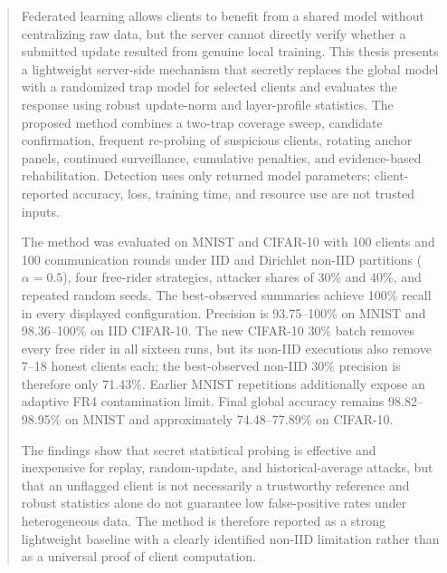 \documentclass{iutmscthesis}
\begin{document}
\begin{abstract}
Federated learning allows clients to benefit from a shared model without centralizing raw data, but the server cannot directly verify whether a submitted update resulted from genuine local training. This thesis presents a lightweight server-side mechanism that secretly replaces the global model with a randomized trap model for selected clients and evaluates the response using robust update-norm and layer-profile statistics. The proposed method combines a two-trap coverage sweep, candidate confirmation, frequent re-probing of suspicious clients, rotating anchor panels, continued surveillance, cumulative penalties, and evidence-based rehabilitation. Detection uses only returned model parameters; client-reported accuracy, loss, training time, and resource use are not trusted inputs.

The method was evaluated on MNIST and CIFAR-10 with 100 clients and 100 communication rounds under IID and Dirichlet non-IID partitions ($\alpha=0.5$), four free-rider strategies, attacker shares of 30\% and 40\%, and repeated random seeds. The best-observed summaries achieve 100\% recall in every displayed configuration. Precision is 93.75--100\% on MNIST and 98.36--100\% on IID CIFAR-10. The new CIFAR-10 30\% batch removes every free rider in all sixteen runs, but its non-IID executions also remove 7--18 honest clients each; the best-observed non-IID 30\% precision is therefore only 71.43\%. Earlier MNIST repetitions additionally expose an adaptive FR4 contamination limit. Final global accuracy remains 98.82--98.95\% on MNIST and approximately 74.48--77.89\% on CIFAR-10.

The findings show that secret statistical probing is effective and inexpensive for replay, random-update, and historical-average attacks, but that an unflagged client is not necessarily a trustworthy reference and robust statistics alone do not guarantee low false-positive rates under heterogeneous data. The method is therefore reported as a strong lightweight baseline with a clearly identified non-IID limitation rather than as a universal proof of client computation.
\end{abstract}





\end{document}
